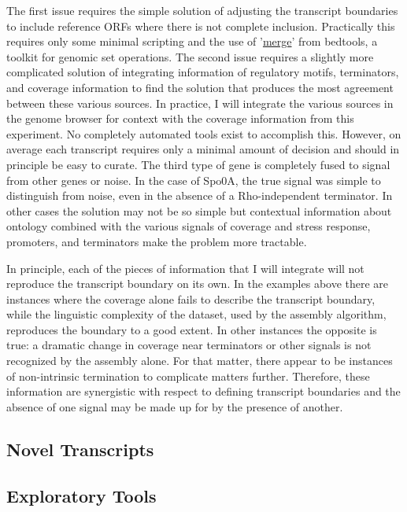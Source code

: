 The first issue requires the simple solution of adjusting the transcript boundaries to include reference ORFs where there is not complete inclusion. Practically this requires only some minimal scripting and the use of '\href{http://bedtools.readthedocs.org/en/latest/content/tools/merge.html}{merge}' from bedtools, a toolkit for genomic set operations. The second issue requires a slightly more complicated solution of integrating information of regulatory motifs, terminators, and coverage information to find the solution that produces the most agreement between these various sources. In practice, I will integrate the various sources in the genome browser for context with the coverage information from this experiment. No completely automated tools exist to accomplish this. However, on average each transcript requires only a minimal amount of decision and should in principle be easy to curate. The third type of gene is completely fused to signal from other genes or noise. In the case of Spo0A, the true signal was simple to distinguish from noise, even in the absence of a Rho-independent terminator. In other cases the solution may not be so simple but contextual information about ontology combined with the various signals of coverage and stress response, promoters, and terminators make the problem more tractable. 

In principle, each of the pieces of information that I will integrate will not reproduce the transcript boundary on its own. In the examples above there are instances where the coverage alone fails to describe the transcript boundary, while the linguistic complexity of the dataset, used by the assembly algorithm, reproduces the boundary to a good extent. In other instances the opposite is true: a dramatic change in coverage near terminators or other signals is not recognized by the assembly alone. For that matter, there appear to be instances of non-intrinsic termination to complicate matters further. Therefore, these information are synergistic with respect to defining transcript boundaries and the absence of one signal may be made up for by the presence of another.

\subsection{Novel Transcripts}

\subsection{Exploratory Tools}



